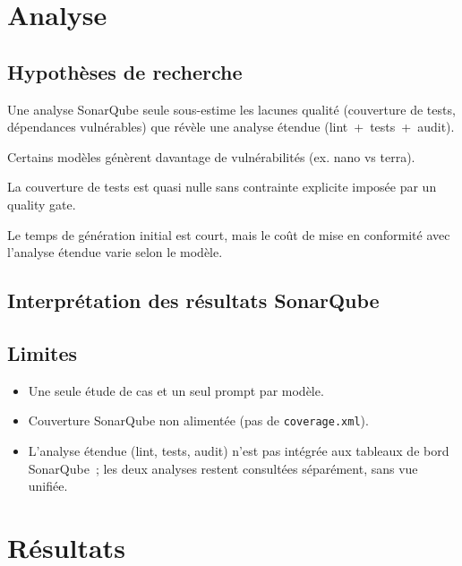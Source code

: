 \documentclass[12pt, a4paper]{article}
\begin{document}
\section{Analyse}

\subsection{Hypothèses de recherche}

\begin{description}[leftmargin=3.5cm, style=nextline]
    \item[H1] Une analyse SonarQube seule sous-estime les lacunes qualité (couverture de
    tests, dépendances vulnérables) que révèle une analyse étendue (lint~+~tests~+~audit).
    \item[H2] Certains modèles génèrent davantage de vulnérabilités (ex. nano vs terra).
    \item[H3] La couverture de tests est quasi nulle sans contrainte explicite imposée par
    un quality gate.
    \item[H4] Le temps de génération initial est court, mais le coût de mise en conformité
    avec l'analyse étendue varie selon le modèle.
\end{description}

\subsection{Interprétation des résultats SonarQube}
    

\subsection{Limites}

\begin{itemize}[leftmargin=*]
    \item Une seule étude de cas et un seul prompt par modèle.
    \item Couverture SonarQube non alimentée (pas de \texttt{coverage.xml}).
    \item L'analyse étendue (lint, tests, audit) n'est pas intégrée aux tableaux de bord
    SonarQube~; les deux analyses restent consultées séparément, sans vue unifiée.
\end{itemize}

\section{Résultats}
\end{document}
